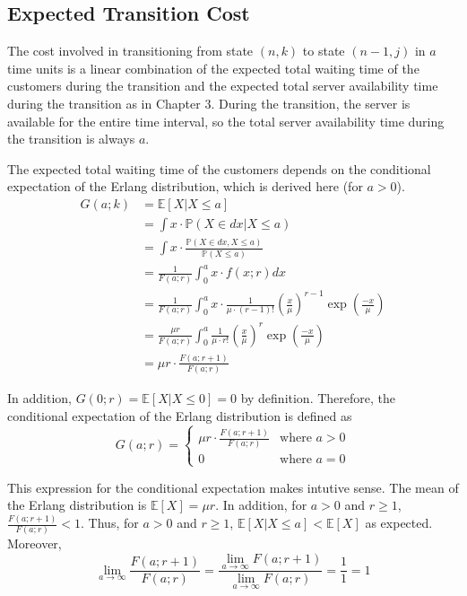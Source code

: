 \subsection{Expected Transition Cost}
The cost involved in transitioning from state $(n, k)$ to state $(n - 1, j)$ in $a$ time units is a linear combination of the expected total waiting time of the customers during the transition and the expected total server availability time during the transition as in Chapter 3. During the transition, the server is available for the entire time interval, so the total server availability time during the transition is always $a$.

The expected total waiting time of the customers depends on the conditional expectation of the Erlang distribution, which is derived here (for $a > 0$).
\begin{align*}
	G (a; k) & = \mathbb{E} [X | X \leq a] \\
	& = \int x \cdot \mathbb{P} (X \in dx | X \leq a) \\
	& = \int x \cdot \frac{\mathbb{P} (X \in dx, X \leq a)}{\mathbb{P} (X \leq a)} \\
	& = \frac{1}{F (a; r)} \int_{0}^{a} x \cdot f(x; r) dx \\
	& = \frac{1}{F (a; r)} \int_{0}^{a} x \cdot \frac{1}{\mu \cdot (r - 1)!} \left( \frac{x}{\mu} \right)^{r - 1} \exp \left( \frac{-x}{\mu} \right) \\
	& = \frac{\mu r}{F (a; r)} \int_{0}^{a} \frac{1}{\mu \cdot r!} \left( \frac{x}{\mu} \right)^{r} \exp \left( \frac{-x}{\mu} \right) \\
	& = \mu r \cdot \frac{F (a; r + 1)}{F (a; r)}
\end{align*}

In addition, $G (0; r) = \mathbb{E} [X | X \leq 0] = 0$ by definition. Therefore, the conditional expectation of the Erlang distribution is defined as
\begin{equation}
	G (a; r) = \begin{cases} \mu r \cdot \frac{F (a; r + 1)}{F (a; r)} & \text{where $a > 0$} \\ 0 & \text{where $a = 0$} \end{cases}
\end{equation}

This expression for the conditional expectation makes intutive sense. The mean of the Erlang distribution is $\mathbb{E} [X] = \mu r$. In addition, for $a > 0$ and $r \geq 1$, $\frac{F (a; r + 1)}{F (a; r)} < 1$. Thus, for $a > 0$ and $r \geq 1$, $\mathbb{E} [X | X \leq a] < \mathbb{E} [X]$ as expected. Moreover, 
\begin{equation}
	\lim_{a \to \infty} \frac{F (a; r + 1)}{F (a; r)} = \frac{\displaystyle \lim_{a \to \infty} F (a; r + 1)}{\displaystyle \lim_{a \to \infty} F (a; r)} = \frac{1}{1} = 1
\end{equation}

